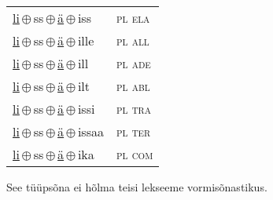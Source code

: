 \begin{minipage}{\textwidth}
\begin{sideways}
\begin{tabular}{l l}
\underline{li}\,$\oplus$\,ss\,$\oplus$\,\underline{ä}\,$\oplus$\,iss & \textsc{ pl ela } \\
\underline{li}\,$\oplus$\,ss\,$\oplus$\,\underline{ä}\,$\oplus$\,ille & \textsc{ pl all } \\
\underline{li}\,$\oplus$\,ss\,$\oplus$\,\underline{ä}\,$\oplus$\,ill & \textsc{ pl ade } \\
\underline{li}\,$\oplus$\,ss\,$\oplus$\,\underline{ä}\,$\oplus$\,ilt & \textsc{ pl abl } \\
\underline{li}\,$\oplus$\,ss\,$\oplus$\,\underline{ä}\,$\oplus$\,issi & \textsc{ pl tra } \\
\underline{li}\,$\oplus$\,ss\,$\oplus$\,\underline{ä}\,$\oplus$\,issaa & \textsc{ pl ter } \\
\underline{li}\,$\oplus$\,ss\,$\oplus$\,\underline{ä}\,$\oplus$\,ika & \textsc{ pl com } \\
\end{tabular}
\end{sideways}
\label{tab:tüüpsõnamall-lisä}

\end{minipage}

 
\vspace{1em}
\noindent See tüüpsõna ei hõlma teisi lekseeme vormi\-sõnastikus.
